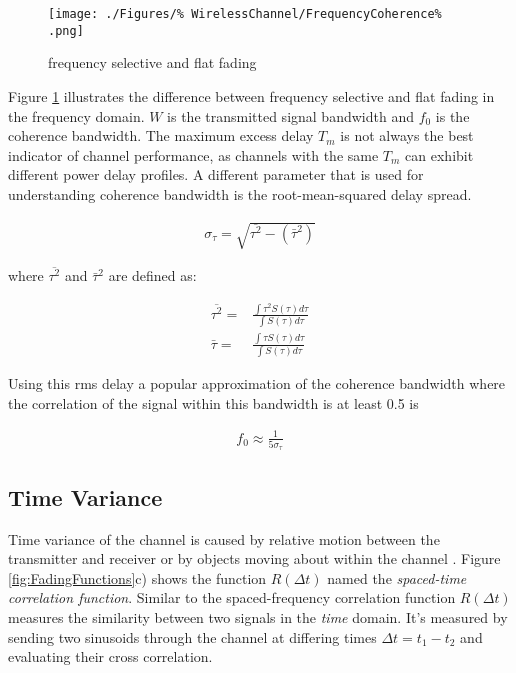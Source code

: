 \begin{figure}[ht]
	\texttt{[image: ./Figures/\%
		WirelessChannel/FrequencyCoherence\%
		.png]}
	\caption{frequency selective and flat fading %
	\cite{Sklar01}}
	\label{fig:FadingFigure}
\end{figure}

Figure \ref{fig:FadingFigure} illustrates the difference %
between frequency selective and flat fading in the %
frequency domain. $W$ is the transmitted signal %
bandwidth and $f_{0}$ is the coherence bandwidth.
\FloatBarrier
The maximum excess delay $T_{m}$ is not always the %
best indicator of channel performance, as channels with %
the same $T_{m}$ can exhibit different power delay profiles. %
A different parameter that is used for understanding %
coherence bandwidth is the root-mean-squared delay spread.

\begin{align}
	\sigma_{\tau} = \sqrt{\overline{\tau^{2}} - (\bar{\tau}^{2})}
\end{align}

where $\overline{\tau^{2}}$ and $\bar{\tau}^{2}$ are defined %
as:

\begin{align}
	\overline{\tau^{2}} =&  \frac{\int \tau^{2} S(\tau) d\tau}{\int S(\tau) d\tau} \\
	\bar{\tau} =& \frac{\int \tau S(\tau) d\tau}{\int S(\tau) d\tau}
\end{align}

Using this rms delay a popular approximation of %
the coherence bandwidth where the correlation %
of the signal within this bandwidth is at least 0.5 is

\begin{align}
	f_{0} \approx \frac{1}{5\sigma_{\tau}}
\end{align}

\subsection{Time Variance}
Time variance of the channel is caused by relative %
motion between the transmitter and receiver or by %
objects moving about within the channel \cite{Sklar01}. %
Figure \ref{fig:FadingFunctions}c) shows the function %
$R(\Delta t)$ named the \emph{spaced-time correlation %
function}. Similar to the spaced-frequency correlation %
function $R(\Delta t)$ measures the similarity between %
two signals in the \emph{time} domain. It's measured %
by sending two sinusoids through the channel at differing %
times $\Delta t = t_{1} - t_{2}$ and evaluating their %
cross correlation. 

